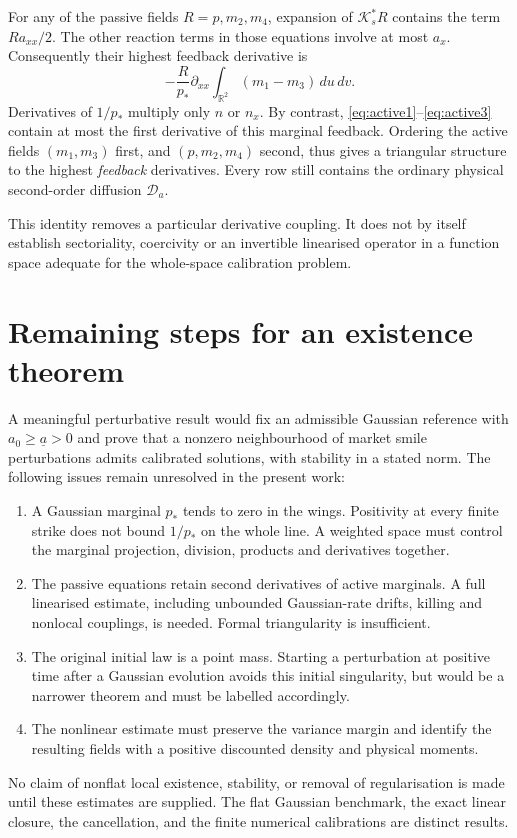 \documentclass[11pt]{article}
\begin{document}
For any of the passive fields $R=p,m_2,m_4$, expansion of
$\mathcal K_s^*R$ contains the term $R a_{xx}/2$. The other reaction terms
in those equations involve at most $a_x$. Consequently their highest feedback
derivative is
\[
 -\frac{R}{p_*}\partial_{xx}\int_{\mathbb R^2}(m_1-m_3)\,du\,dv.
\]
Derivatives of $1/p_*$ multiply only $n$ or $n_x$. By contrast,
\eqref{eq:active1}--\eqref{eq:active3} contain at most the first derivative of
this marginal feedback. Ordering the active fields $(m_1,m_3)$ first, and
$(p,m_2,m_4)$ second, thus gives a triangular structure to the highest
\emph{feedback} derivatives. Every row still contains the ordinary physical
second-order diffusion $\mathcal D_a$.

This identity removes a particular derivative coupling. It does not by itself
establish sectoriality, coercivity or an invertible linearised operator in a
function space adequate for the whole-space calibration problem.

\section{Remaining steps for an existence theorem}
A meaningful perturbative result would fix an admissible Gaussian reference
with $a_0\geq\underline a>0$ and prove that a nonzero neighbourhood of market
smile perturbations admits calibrated solutions, with stability in a stated
norm. The following issues remain unresolved in the present work:
\begin{enumerate}
\item A Gaussian marginal $p_*$ tends to zero in the wings. Positivity at every
finite strike does not bound $1/p_*$ on the whole line. A weighted space must
control the marginal projection, division, products and derivatives together.
\item The passive equations retain second derivatives of active marginals.
A full linearised estimate, including unbounded Gaussian-rate drifts, killing
and nonlocal couplings, is needed. Formal triangularity is insufficient.
\item The original initial law is a point mass. Starting a perturbation at
positive time after a Gaussian evolution avoids this initial singularity,
but would be a narrower theorem and must be labelled accordingly.
\item The nonlinear estimate must preserve the variance margin and identify
the resulting fields with a positive discounted density and physical moments.
\end{enumerate}
No claim of nonflat local existence, stability, or removal of regularisation
is made until these estimates are supplied. The flat Gaussian benchmark,
the exact linear closure, the cancellation, and the finite numerical
calibrations are distinct results.
\end{document}
